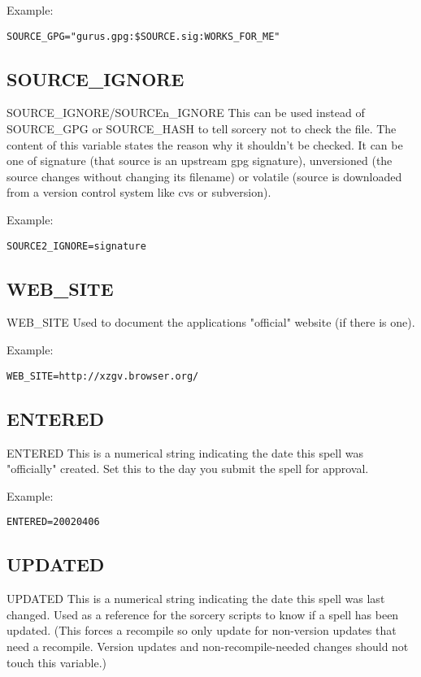 \documentclass[a4paper,10pt]{book}
\begin{document}
Example:
\begin{verbatim}
SOURCE_GPG="gurus.gpg:$SOURCE.sig:WORKS_FOR_ME"
\end{verbatim}

\subsection{SOURCE\_IGNORE}
SOURCE\_IGNORE/SOURCEn\_IGNORE
	This can be used instead of SOURCE\_GPG or SOURCE\_HASH to tell sorcery
	not to check the file. The content of this variable states the reason
	why it shouldn't be checked. It can be one of signature (that source
	is an upstream gpg signature), unversioned (the source changes
	without changing its filename) or volatile (source is downloaded from
	a version control system like cvs or subversion).

Example:
\begin{verbatim}
SOURCE2_IGNORE=signature
\end{verbatim}

\subsection{WEB\_SITE}
WEB\_SITE
	Used to document the applications "official" website (if there is one).

Example:
\begin{verbatim}
WEB_SITE=http://xzgv.browser.org/
\end{verbatim}

\subsection{ENTERED}
ENTERED
	This is a numerical string indicating the date this spell was
	"officially" created. Set this to the day you submit the spell for
	approval.

Example:
\begin{verbatim}
ENTERED=20020406
\end{verbatim}

\subsection{UPDATED}
UPDATED
	This is a numerical string indicating the date this spell was last
	changed. Used as a reference for the sorcery scripts to know if a
	spell has been updated. (This forces a recompile so only update for
	non-version updates that need a recompile. Version updates and
	non-recompile-needed changes should not touch this variable.)
\end{document}
